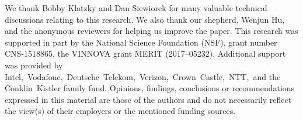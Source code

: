 \begin{acks}
    We thank Bobby Klatzky and Dan Siewiorek for many valuable technical discussions relating to this research.
    We also thank our shepherd, Wenjun Hu, and the anonymous reviewers for helping us improve the paper.
    This research was supported in part by the National Science Foundation (NSF), grant number CNS-1518865, the VINNOVA grant MERIT (2017--05232).
    Additional support was provided by Intel,\ Vodafone,\ Deutsche~Telekom,\ Verizon,\ Crown~Castle,\ NTT,\ and the Conklin~Kistler family fund.
    Opinions, findings, conclusions or recommendations expressed in this material are those of the authors and do not necessarily reflect the view(s) of their employers or the mentioned funding sources.
\end{acks}